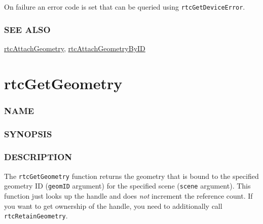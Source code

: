 On failure an error code is set that can be queried using
\texttt{rtcGetDeviceError}.

\subsubsection{SEE ALSO}\label{see-also}

\hyperref[rtcattachgeometry]{rtcAttachGeometry},
\hyperref[rtcattachgeometrybyid]{rtcAttachGeometryByID}

\pagebreak

\section{rtcGetGeometry}\label{rtcgetgeometry}

\subsubsection{NAME}\label{name}

\begin{Shaded}
\begin{Highlighting}[]
\OperatorTok{{-}}
\end{Highlighting}
\end{Shaded}

\subsubsection{SYNOPSIS}\label{synopsis}

\begin{Shaded}
\begin{Highlighting}[]

\OperatorTok{(}\OperatorTok{,}  \OperatorTok{);}
\end{Highlighting}
\end{Shaded}

\subsubsection{DESCRIPTION}\label{description}

The \texttt{rtcGetGeometry} function returns the geometry that is bound
to the specified geometry ID (\texttt{geomID} argument) for the
specified scene (\texttt{scene} argument). This function just looks up
the handle and does \emph{not} increment the reference count. If you
want to get ownership of the handle, you need to additionally call
\texttt{rtcRetainGeometry}.

